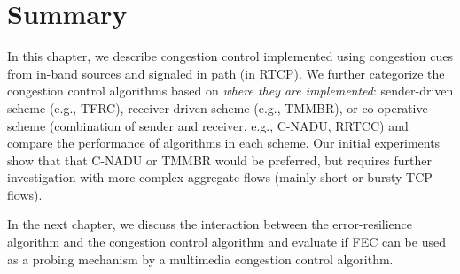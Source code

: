 \section{Summary}

In this chapter, we describe congestion control implemented using congestion
cues from in-band sources and signaled in path (in RTCP). We further
categorize the congestion control algorithms based on \emph{where they are
implemented}: sender-driven scheme (e.g., TFRC), receiver-driven scheme (e.g.,
TMMBR), or co-operative scheme (combination of sender and receiver, e.g.,
C-NADU, RRTCC) and compare the performance of algorithms in each scheme. Our
initial experiments show that that C-NADU or TMMBR would be preferred, but
requires further investigation with more complex aggregate flows (mainly short
or bursty TCP flows).

In the next chapter, we discuss the interaction between the error-resilience
algorithm and the congestion control algorithm and evaluate if FEC can be used
as a probing mechanism by a multimedia congestion control algorithm.
